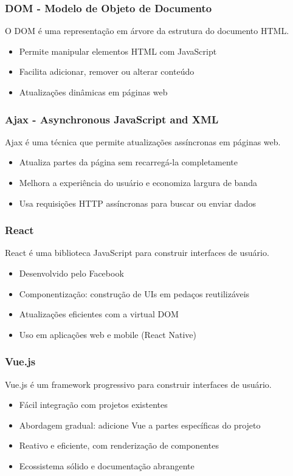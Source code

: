 \documentclass[13pt, xcolor={dvipsnames,svgnames}, portuguese]{beamer}
\begin{document}
\begin{frame}
\frametitle{DOM - Modelo de Objeto de Documento}

O DOM é uma representação em árvore da estrutura do documento HTML.

\begin{itemize}
  \item Permite manipular elementos HTML com JavaScript
  \item Facilita adicionar, remover ou alterar conteúdo
  \item Atualizações dinâmicas em páginas web
\end{itemize}

\end{frame}

\begin{frame}
\frametitle{Ajax - Asynchronous JavaScript and XML}

Ajax é uma técnica que permite atualizações assíncronas em páginas web.

\begin{itemize}
  \item Atualiza partes da página sem recarregá-la completamente
  \item Melhora a experiência do usuário e economiza largura de banda
  \item Usa requisições HTTP assíncronas para buscar ou enviar dados
\end{itemize}

\end{frame}

\begin{frame}
\frametitle{React}

React é uma biblioteca JavaScript para construir interfaces de usuário.

\begin{itemize}
  \item Desenvolvido pelo Facebook
  \item Componentização: construção de UIs em pedaços reutilizáveis
  \item Atualizações eficientes com a virtual DOM
  \item Uso em aplicações web e mobile (React Native)
\end{itemize}

\end{frame}


\begin{frame}
\frametitle{Vue.js}

Vue.js é um framework progressivo para construir interfaces de usuário.

\begin{itemize}
  \item Fácil integração com projetos existentes
  \item Abordagem gradual: adicione Vue a partes específicas do projeto
  \item Reativo e eficiente, com renderização de componentes
  \item Ecossistema sólido e documentação abrangente
\end{itemize}

\end{frame}
\end{document}
